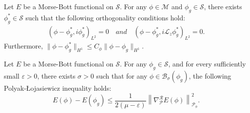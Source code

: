 \documentclass[10pt,a4paper]{amsart}
\begin{document}
\begin{lemma}\label{Transfer}
	Let $E$ be a
	Morse-Bott functional on $\mathcal{S}$. For any $\phi \in \mathcal{M}$ and $\phi_g\in\mathcal{S}$, there exists $\phi^*_g \in \mathcal{S}$ such that the following orthogonality conditions hold:
	{\rm
		\begin{align*}
			(\phi-\phi_g^*,i\phi_g^*)_{L^2}=0\quad and\quad(\phi-\phi_g^*,i\mathcal{L}_z\phi_g^*)_{L^2}=0.
		\end{align*}
	}
	Furthermore, $\|\phi-\phi_g^*\|_{H^1}\le C_{\phi} \|\phi-\phi_g\|_{H^1}.$
\end{lemma}

\begin{lemma}\label{Polyak-Loj}
	Let $E$ be a Morse-Bott functional on $\mathcal{S}$. For any $\phi_g\in\mathcal{S}$, and for every sufficiently small $\varepsilon>0$, there exists $\sigma>0$ such that for any $\phi \in \mathcal{B}_{\sigma}(\phi_g)$, the following Polyak-\L ojasiewicz inequality holds:
	\[
	E(\phi) - E(\phi_g)\leq \frac{1}{2(\mu - \varepsilon)} \left\| \nabla^{\mathcal{R}}_{\mathcal{P}} E(\phi)\right\|^2_{\mathcal{P}_{\phi}}.
	\]
\end{lemma}
\end{document}
